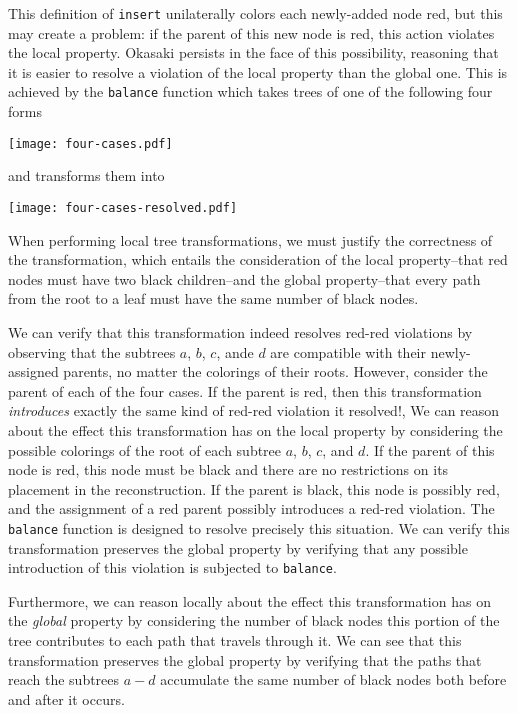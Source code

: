 \documentclass[preprint]{sigplanconf}
\begin{document}
This definition of \texttt{insert} unilaterally colors each newly-added node red, but this may create a problem: if the parent of this new node is red, this action violates the local property. Okasaki persists in the face of this possibility, reasoning that it is easier to resolve a violation of the local property than the global one. This is achieved by the \texttt{balance} function which takes trees of one of the following four forms
\begin{center}
\texttt{[image: four-cases.pdf]}
\end{center}
and transforms them into
\begin{center}
\texttt{[image: four-cases-resolved.pdf]}
\end{center}

When performing local tree transformations, we must justify the correctness of the transformation, which entails the consideration of the local property--that red nodes must have two black children--and the global property--that every path from the root to a leaf must have the same number of black nodes.

We can verify that this transformation indeed resolves red-red violations by observing that the subtrees $a$, $b$, $c$, ande $d$ are compatible with their newly-assigned parents, no matter the colorings of their roots. However, consider the parent of each of the four cases. If the parent is red, then this transformation \emph{introduces} exactly the same kind of red-red violation it resolved!, 
We can reason about the effect this transformation has on the local property by considering the possible colorings of the root of each subtree $a$, $b$, $c$, and $d$. If the parent of this node is red, this node must be black and there are no restrictions on its placement in the reconstruction. If the parent is black, this node is possibly red, and the assignment of a red parent possibly introduces a red-red violation. The \texttt{balance} function is designed to resolve precisely this situation. We can verify this transformation preserves the global property by verifying that any possible introduction of this violation is subjected to \texttt{balance}.

Furthermore, we can reason locally about the effect this transformation has on the \emph{global} property by considering the number of black nodes this portion of the tree contributes to each path that travels through it. We can see that this transformation preserves the global property by verifying that the paths that reach the subtrees $a-d$ accumulate the same number of black nodes both before and after it occurs.
\end{document}
